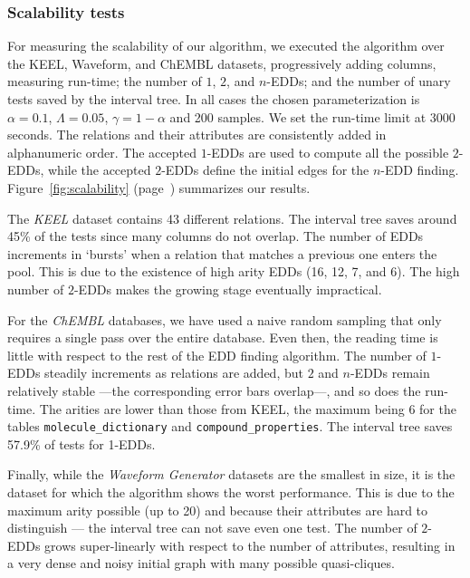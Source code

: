 \subsubsection{Scalability tests}
\label{sec:scalability}

For measuring the scalability of our algorithm, we executed the algorithm over the KEEL, Waveform, and ChEMBL datasets, progressively adding columns, measuring run-time; the
number of $1$, $2$, and $n$-EDDs; and the number of unary tests saved by the interval
tree.
In all cases the chosen parameterization is $\alpha=0.1$, $\Lambda = 0.05$,
$\gamma = 1 - \alpha$ and 200 samples. We set the run-time limit at 3000 seconds.
The relations and their attributes are consistently added in alphanumeric order.
The accepted $1$-EDDs are used to compute all the possible $2$-EDDs, while the accepted $2$-EDDs
define the initial edges for the $n$-EDD finding.
Figure~\ref{fig:scalability} (page~\pageref{fig:scalability}) summarizes our results.


The \emph{KEEL} dataset contains 43 different relations. The interval tree saves around 45\% of
the tests since many columns do not overlap. The number of \glspl{EDD} increments in `bursts' when a
relation that matches a previous one enters the pool. This is due to the existence of
high arity \glspl{EDD} (16, 12, 7, and 6).
The high number of $2$-EDDs makes the growing stage eventually impractical.

For the \emph{ChEMBL} databases, we have used a naive random sampling that only requires a single
pass over the entire database. Even then, the reading time is little with respect to the rest of the EDD
finding algorithm. The number of $1$-EDDs steadily increments as relations are added, but $2$
and $n$-EDDs remain relatively stable ---the corresponding error bars overlap---, and so does the run-time.
The arities are lower than those from KEEL, the maximum being 6 for the tables \texttt{molecule\_dictionary}
and \texttt{compound\_properties}. The interval tree saves 57.9\% of tests for 1-EDDs.

Finally, while the \emph{Waveform Generator} datasets are the smallest in size,
it is the dataset for which the
algorithm shows the worst performance. This is due to the maximum arity possible (up to 20) and 
because their attributes are hard to distinguish --- the interval tree can not save even one test. The
number of $2$-EDDs grows super-linearly with respect to the number of attributes, resulting in a very
dense and noisy initial graph with many possible quasi-cliques.

